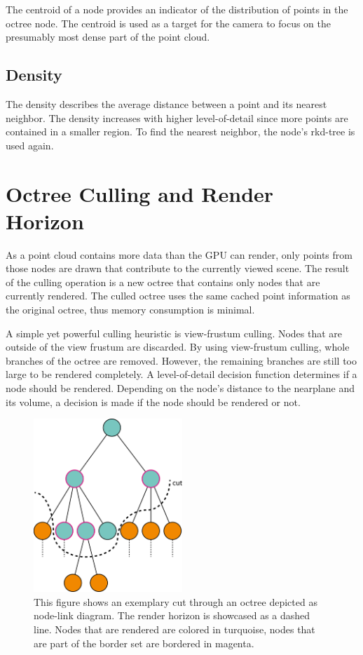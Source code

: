 The centroid of a node provides an indicator of the distribution of points in the octree node. The centroid is used as a target for the camera to focus on the presumably most dense part of the point cloud. 


\subsection{Density}

The density describes the average distance between a point and its nearest neighbor. The density increases with higher level-of-detail since more points are contained in a smaller region. To find the nearest neighbor, the node's rkd-tree is used again.


\section{Octree Culling and Render Horizon}
\label{sec:renderHorizon}

As a point cloud contains more data than the GPU can render, only points from those nodes are drawn that contribute to the currently viewed scene. The result of the culling operation is a new octree that contains only nodes that are currently rendered. The culled octree uses the same cached point information as the original octree, thus memory consumption is minimal. 

\par

A simple yet powerful culling heuristic is view-frustum culling. Nodes that are outside of the view frustum are discarded. By using view-frustum culling, whole branches of the octree are removed. However, the remaining branches are still too large to be rendered completely. A level-of-detail decision function determines if a node should be rendered. Depending on the node's distance to the nearplane and its volume, a decision is made if the node should be rendered or not. 

\begin{figure}
    \centering
    \includegraphics[width=0.5\textwidth]{Octree/renderHorizon.png}
    \caption[Illustration of the render horizon of an octree.]
		{This figure shows an exemplary cut through an octree depicted as node-link diagram. The render horizon is showcased as a dashed line. Nodes that are rendered are colored in turquoise, nodes that are part of the border set are bordered in magenta.}
    \label{fig:renderHorizon}
\end{figure}


